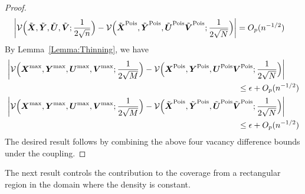 \documentclass[11pt]{article}
\newcommand{\bs}[1]{\boldsymbol{#1}}
\begin{document}
\begin{proof}
\begin{align*}
    \biggl|\mathcal{V}\Bigl(\tilde{\bs{X}},\tilde{\bs{Y}},\tilde{\bs{U}}, \tilde{\bs{V}};\frac{1}{2\sqrt{n}}\Bigr) - \mathcal{V}\Bigl(\tilde{\bs{X}}^{\mathrm{Pois}},\tilde{\bs{Y}}^{\mathrm{Pois}},\tilde{\bs{U}}^{\mathrm{Pois}} \tilde{\bs{V}}^{\mathrm{Pois}};\frac{1}{2\sqrt{N}}\Bigr)\biggr| &= O_p(n^{-1/2})
\end{align*}
By Lemma~\ref{Lemma:Thinning}, we have 
\begin{align*}
    \biggl|\mathcal{V}\Bigl(\bs{X}^{\mathrm{max}},\bs{Y}^{\mathrm{max}},\bs{U}^{\mathrm{max}}, \bs{V}^{\mathrm{max}};\frac{1}{2\sqrt{M}}\Bigr) &- \mathcal{V}\Bigl(\bs{X}^{\mathrm{Pois}},\bs{Y}^{\mathrm{Pois}},\bs{U}^{\mathrm{Pois}} \bs{V}^{\mathrm{Pois}};\frac{1}{2\sqrt{N}}\Bigr)\biggr| \\
    &\hspace{4cm}\leq \epsilon+ O_p(n^{-1/2}) \\
    \biggl|\mathcal{V}\Bigl(\bs{X}^{\mathrm{max}},\bs{Y}^{\mathrm{max}},\bs{U}^{\mathrm{max}}, \bs{V}^{\mathrm{max}};\frac{1}{2\sqrt{M}}\Bigr) &- \mathcal{V}\Bigl(\tilde{\bs{X}}^{\mathrm{Pois}},\tilde{\bs{Y}}^{\mathrm{Pois}},\tilde{\bs{U}}^{\mathrm{Pois}} \tilde{\bs{V}}^{\mathrm{Pois}};\frac{1}{2\sqrt{N}}\Bigr)\biggr| \\
    &\hspace{4cm}\leq \epsilon +  O_p(n^{-1/2})
\end{align*}
The desired result follows by combining the above four vacancy difference bounds under the coupling.
\end{proof}


The next result controls the contribution to the coverage from a rectangular region in the domain where the density is constant.
\end{document}
